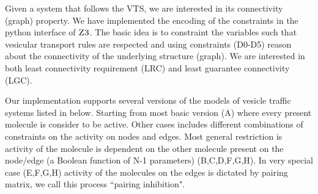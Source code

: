 Given a system that follows the VTS, we are interested in its connectivity (graph) property. We have implemented the encoding of the constraints in the python interface of $\textsc{Z3}$. The basic idea is to constraint the variables such that vesicular transport rules are respected and using constraints (D0-D5) reason about the connectivity of the underlying structure (graph). We are interested in both least connectivity requirement (LRC) and least guarantee connectivity (LGC).


%
Our implementation supports several versions of the models of vesicle traffic systems listed in below. Starting from most basic version (A) where every present molecule is consider to be active. Other cases includes different combinations of constraints on the activity on nodes and edges. Most general restriction is activity of the molecule is dependent on the other molecule present on the node/edge (a Boolean function of N-1 parameters) (B,C,D,F,G,H). In very special case (E,F,G,H) activity of the molecules on the edges is dictated by pairing matrix, we call this process ``pairing inhibition".


